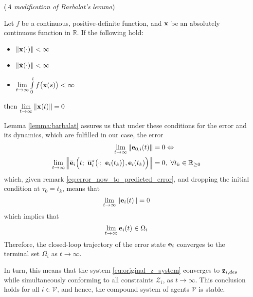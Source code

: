 \begin{bw_box}
  \begin{lemma} (\textit{A modification of Barbalat's lemma}\cite{Fontes2007})
  \label{lemma:barbalat}

    Let $f$ be a continuous, positive-definite function, and $\bm{\mathbf{x}}$ be an
    absolutely continuous function in $\mathbb{R}$. If the following hold:
  \begin{itemize}
    \item $\|\bm{\mathbf{x}}(\cdot)\| < \infty$
    \item $\|\dot{\bm{\mathbf{x}}}(\cdot)\| < \infty$
    \item $\lim\limits_{t \to \infty} \int\limits_0^t f\big(\bm{\mathbf{x}}(s)\big) < \infty$
  \end{itemize}
  then $\lim\limits_{t \to \infty} \|\bm{\mathbf{x}}(t)\| = 0$
  \end{lemma}
\end{bw_box}
Lemma \eqref{lemma:barbalat} assures us that under these conditions for the
error and its dynamics, which are fulfilled in our case, the error
\begin{align}
  \lim\limits_{t \to \infty}\|\vect{e}_{0,i}(t)\| &= 0 \Leftrightarrow \\
  \lim\limits_{t \to \infty}
  \Big\| \overline{\vect{e}}_i\Big(t;\ \overline{\vect{u}}_i^{\star}\big(\cdot;\ \vect{e}_i(t_k)\big), \vect{e}_i(t_k) \Big) \Big\| &= 0,\
\forall t_k \in \mathbb{R}_{\geq 0}
\end{align}
which, given remark \eqref{eq:error_now_to_predicted_error},
and dropping the initial condition at $\tau_0 = t_k$, means that
$$\lim\limits_{t \to \infty}\|\bm{\mathbf{e}}_i(t)\| = 0$$
which implies that
$$\lim\limits_{t \to \infty}\bm{\mathbf{e}}_i(t) \in \Omega_i$$
Therefore, the closed-loop trajectory of the error state $\bm{\mathbf{e}}_i$ converges
to the terminal set $\Omega_i$ as $t \to \infty$.

In turn, this means that the system \eqref{eq:original_z_system} converges
to $\bm{\mathbf{z}}_{i,des}$ while simultaneously conforming to
all constraints $\mathcal{Z}_i$, as $t \to \infty$. This conclusion holds
for all $i \in \mathcal{V}$, and hence, the compound system of agents
$\mathcal{V}$ is stable.
\qedsymbol
